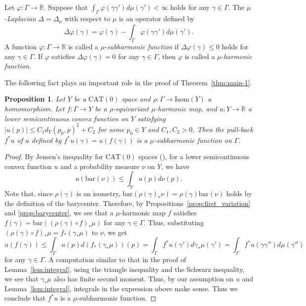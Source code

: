 \documentclass[12pt]{amsart}
\numberwithin{equation}{section}
\theoremstyle{plain}
\newtheorem{Proposition}[Theorem]{Proposition}
\theoremstyle{definition}
\theoremstyle{remark}
\newcommand{\R}{{\mathbb R}}
\newcommand{\isom}[1]{\mathrm{Isom}({#1})}
\newcommand{\cat}[1]{\mathrm{CAT}(#1)}
\newcommand{\bary}[1]{\mathrm{bar}(#1)}
\begin{document}
%
%
Let $\varphi \colon \Gamma \rightarrow \R$.  
Suppose that 
$\int_{\Gamma} \varphi(\gamma \gamma') d\mu(\gamma')<\infty$ 
holds for any $\gamma \in \Gamma$. 
The {\it $\mu$-Laplacian} $\Delta=\Delta_{\mu}$ with respect to
$\mu$ is an operator defined by 
\begin{equation*}
 \Delta \varphi(\gamma) 
 = \varphi(\gamma) - \int_{\Gamma}
    \varphi(\gamma \gamma') d\mu(\gamma'). 
\end{equation*}
A function $\varphi \colon \Gamma \rightarrow \R$ is called a 
$\mu$-{\it subharmonic function} if $\Delta \varphi(\gamma)\leq 0$ holds
for any $\gamma \in \Gamma$.  
If $\varphi$ satisfies $\Delta \varphi(\gamma)=0$ for any
$\gamma\in\Gamma$, then $\varphi$ is called a $\mu$-{\it harmonic
function}. 

The following fact plays an important role in the proof of 
Theorem~\ref{thm:main-1}.

\begin{Proposition}
 \label{prop:pullback-is-subharmonic}
 Let $Y$ be a $\cat{0}$ space and 
 $\rho\colon \Gamma\rightarrow \isom{Y}$ a homomorphism. 
 Let $f\colon \Gamma\rightarrow Y$ be a $\rho$-equivariant
 $\mu$-harmonic map, and $u \colon Y \rightarrow \R$ a lower
 semicontinuous convex function on $Y$ satisfying 
 $|u(p)| \leq C_1 d_Y(p_0,p)^2+C_2$ for some $p_0 \in Y$
 and $C_1,C_2>0$. 
 Then the pull-back $f^*u$ of $u$ defined by $f^*u(\gamma)=u(f(\gamma))$
 is a $\mu$-subharmonic function on $\Gamma$. 
\end{Proposition}

\begin{proof}
 By Jensen's inequality for $\cat{0}$ spaces 
 (\cite[p.~242, Proposition 12.3]{eells-fuglede}), for a lower
 semicontinuous convex function $u$
 and a probability measure $\nu$ on $Y$, we have
\begin{equation*}
 u(\bary{\nu}) \leq \int_Y u(p) d\nu(p). 
\end{equation*}
 Note that, since $\rho(\gamma)$ is an isometry, 
 $\bary{\rho(\gamma)_* \nu}=\rho(\gamma)\bary{\nu}$ holds by the
 definition of the barycenter. 
 Therefore, by Propositions~\ref{prop:first_variation} and
 \ref{prop:barycenter},  we see that a $\mu$-harmonic map $f$ satisfies 
 $f(\gamma)=\bary{(\rho(\gamma)\circ f)_*\mu}$ for any 
 $\gamma \in \Gamma$. 
 Thus, substituting $(\rho(\gamma)\circ f)_*\mu=f_*(\gamma_* \mu)$ to
 $\nu$, we get 
\begin{equation*}
 u(f(\gamma)) \leq 
 \int_{\Gamma} u(p) d (f_*(\gamma_*\mu))(p)=
 \int_{\Gamma} f^*u(\gamma') d\gamma_*\mu(\gamma') 
 = \int_{\Gamma} f^*u(\gamma\gamma'') d\mu(\gamma'')
\end{equation*}
 for any $\gamma\in \Gamma$. 
 A computation similar to that in the proof of Lemma~\ref{lem:integral},
 using the triangle inequality and the Schwarz inequality, 
 we see that $\gamma_*\mu$ also has finite second moment. 
 Thus, by our assumption on $u$ and Lemma~\ref{lem:integral}, 
 integrals in the expression above make sense. 
 Thus we conclude that $f^*u$ is a $\mu$-subharmonic function. 
\end{proof}
\end{document}
